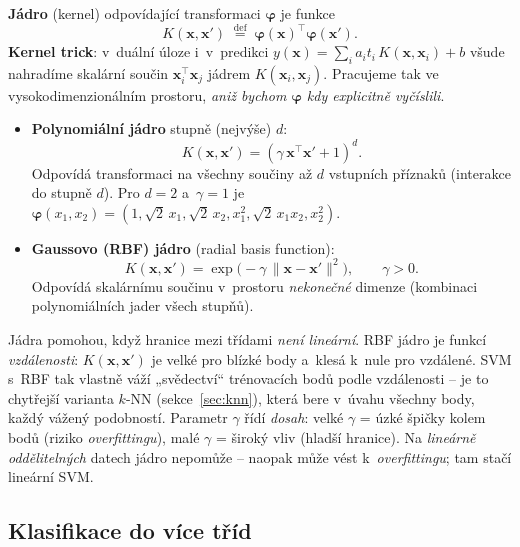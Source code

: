 \begin{definice}
\textbf{Jádro} (kernel) odpovídající transformaci $\boldsymbol{\varphi}$ je funkce
\[ K(\mathbf{x},\mathbf{x}') \;\stackrel{\text{def}}{=}\; \boldsymbol{\varphi}(\mathbf{x})^{\!\top}\boldsymbol{\varphi}(\mathbf{x}'). \]
\textbf{Kernel trick}: v~duální úloze i~v~predikci $y(\mathbf{x})=\sum_i a_i t_i\,K(\mathbf{x},\mathbf{x}_i)+b$ všude nahradíme skalární součin $\mathbf{x}_i^{\!\top}\mathbf{x}_j$ jádrem $K(\mathbf{x}_i,\mathbf{x}_j)$. Pracujeme tak ve vysokodimenzionálním prostoru, \emph{aniž bychom $\boldsymbol{\varphi}$ kdy explicitně vyčíslili}.
\end{definice}

\begin{definice}
\begin{itemize}
  \item \textbf{Polynomiální jádro} stupně (nejvýše) $d$:
    \[ K(\mathbf{x},\mathbf{x}') = (\gamma\,\mathbf{x}^{\!\top}\mathbf{x}' + 1)^d. \]
    Odpovídá transformaci na všechny součiny až $d$ vstupních příznaků (interakce do stupně $d$). Pro $d=2$ a~$\gamma=1$ je $\boldsymbol{\varphi}(x_1,x_2)=(1,\sqrt2\,x_1,\sqrt2\,x_2,x_1^2,\sqrt2\,x_1x_2,x_2^2)$.
  \item \textbf{Gaussovo (RBF) jádro} (radial basis function):
    \[ K(\mathbf{x},\mathbf{x}') = \exp\!\big(-\gamma\,\|\mathbf{x}-\mathbf{x}'\|^2\big),\qquad \gamma>0. \]
    Odpovídá skalárnímu součinu v~prostoru \emph{nekonečné} dimenze (kombinaci polynomiálních jader všech stupňů).
\end{itemize}
\end{definice}

\begin{intuice}
Jádra pomohou, když hranice mezi třídami \emph{není lineární}. RBF jádro je funkcí \emph{vzdálenosti}: $K(\mathbf{x},\mathbf{x}')$ je velké pro blízké body a~klesá k~nule pro vzdálené. SVM s~RBF tak vlastně váží „svědectví`` trénovacích bodů podle vzdálenosti -- je to chytřejší varianta $k$-NN (sekce~\ref{sec:knn}), která bere v~úvahu všechny body, každý vážený podobností. Parametr $\gamma$ řídí \emph{dosah}: velké $\gamma$ = úzké špičky kolem bodů (riziko \emph{overfittingu}), malé $\gamma$ = široký vliv (hladší hranice). Na \emph{lineárně oddělitelných} datech jádro nepomůže -- naopak může vést k~\emph{overfittingu}; tam stačí lineární SVM.
\end{intuice}

\subsection{Klasifikace do více tříd}

